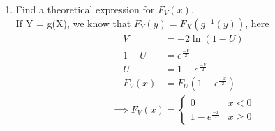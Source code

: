 \documentclass[journal,12pt,twocolumn]{IEEEtran}
\begin{document}
\begin{enumerate}[label=\thesection.\arabic*
,ref=\thesection.\theenumi]
\begin{figure}[!h]
\caption{The PDF of $X$}
\label{fig:3.1}
\end{figure}
\item Find a theoretical expression for $F_V(x)$.\\
\solution
If Y = g(X), we know that $F_Y(y) = F_X(g^{-1}(y))$, here 
\begin{align}
V &= -2\ln{(1-U)} \\
1-U &= e^{\frac{-V}{2}}\\
U &= 1 - e^{\frac{-V}{2}} \\ 
F_V(x) &= F_U(1 - e^{\frac{-x}{2}}) 
\end{align}
 \begin{align}
\implies
  F_V(x)=
  \begin{cases}
   0                         & x < 0 \\
	1 - e^{\frac{-x}{2}} & x \geq 0
	\end{cases}
 \end{align}
\end{enumerate}
\end{document}
